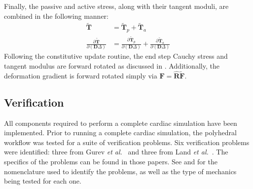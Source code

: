 Finally, the passive and active stress, along with their tangent moduli, are combined in the following manner:
\begin{align}
\tilde{\bm{T}} &= \tilde{\bm{T}}_p + \tilde{\bm{T}}_a \\
\frac{\partial \tilde{\bm{T}}}{\partial (\bm{D}\Delta)} &= \frac{\partial \tilde{\bm{T}}_p}{\partial (\bm{D}\Delta)}+ \frac{\partial \tilde{\bm{T}}_a}{\partial (\bm{D}\Delta)}
\end{align}
Following the constitutive update routine, the end step Cauchy stress and tangent modulus are forward rotated as discussed in . Additionally, the deformation gradient is forward rotated simply via $\bm{F} =\hat{\bm{R}}\tilde{\bm{F}}$.


\subsection{Verification}

All components required to perform a complete cardiac simulation have been implemented. Prior to running a complete cardiac simulation, the polyhedral workflow was tested for a suite of verification problems. Six verification problems were identified: three from Gurev \textit{et al.}~\cite{gurev_2015} and three from Land \textit{et al.}~\cite{land_2015}. The specifics of the problems can be found in those papers. See  and  for the nomenclature used to identify the problems, as well as the type of mechanics being tested for each one.

